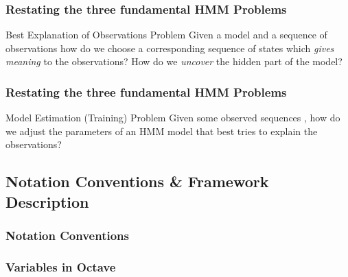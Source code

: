 \begin{frame}
  \frametitle{Restating the three fundamental HMM Problems}
  \begin{block}{Best Explanation of Observations Problem}
    Given a model  and a
    sequence of observations  how do we choose a corresponding sequence of
    \alert{states} 
    which \emph{gives meaning} to the observations?  How do we
    \emph{uncover} the hidden part of the model?
  \end{block}
\end{frame}




\begin{frame}
  \frametitle{Restating the three fundamental HMM Problems}
  \begin{block}{Model Estimation (Training) Problem}
    Given some observed sequences , how do we adjust the
    \alert{parameters}  of an
    HMM model that best tries to explain the observations?
  \end{block}
\end{frame}



\subsection{Notation Conventions \& Framework Description}
\label{sec:octave}

\begin{frame}
  \frametitle{Notation Conventions}

  
\end{frame}


\begin{frame}
  \frametitle{Variables in Octave}

  
\end{frame}
